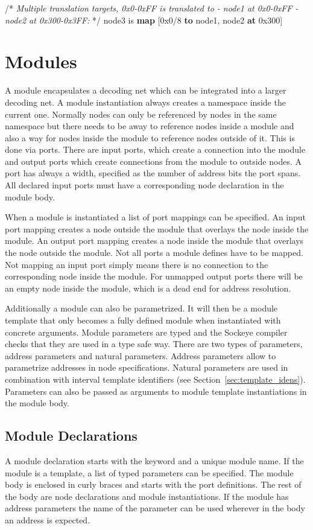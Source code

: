 \documentclass[a4paper,11pt,twoside]{report}
\begin{document}
{{{\begin{syntax}
    /* \textit{Multiple translation targets, \textup{0x0-0xFF} is translated to
       - \textup{node1} at \textup{0x0-0xFF}
       - \textup{node2} at \textup{0x300-0x3FF}:} */
    node3 is \textbf{map} [0x0/8 \textbf{to} node1, node2 \textbf{at} 0x300]
\end{syntax}

\section{Modules}
\label{sec:modules}
A module encapsulates a decoding net which can be integrated into a larger decoding net.
A module instantiation always creates a namespace inside the current one.
Normally nodes can only be referenced by nodes in the same namespace but there needs to be away to reference nodes inside a module and also a way for nodes inside the module to reference nodes outside of it.
This is done via ports.
There are input ports, which create a connection into the module and output ports which create connections from the module to outside nodes.
A port has always a width, specified as the number of address bits the port spans.
All declared input ports must have a corresponding node declaration in the module body.

When a module is instantiated a list of port mappings can be specified.
An input port mapping creates a node outside the module that overlays the node inside the module.
An output port mapping creates a node inside the module that overlays the node outside the module.
Not all ports a module defines have to be mapped.
Not mapping an input port simply means there is no connection to the corresponding node inside the module.
For unmapped output ports there will be an empty node inside the module, which is a dead end for address resolution.

Additionally a module can also be parametrized.
It will then be a module template that only becomes a fully defined module when instantiated with concrete arguments.
Module parameters are typed and the Sockeye compiler checks that they are used in a type safe way.
There are two types of parameters, address parameters and natural parameters.
Address parameters allow to parametrize addresses in node specifications.
Natural parameters are used in combination with interval template identifiers (see Section~\ref{sec:template_idens}).
Parameters can also be passed as arguments to module template instantiations in the module body.

\subsection{Module Declarations}
A module declaration starts with the keyword  and a unique module name.
If the module is a template, a list of typed parameters can be specified.
The module body is enclosed in curly braces and starts with the port definitions.
The rest of the body are node declarations and module instantiations.
If the module has address parameters the name of the parameter can be used wherever in the body an address is expected.

}}}
\end{document}
